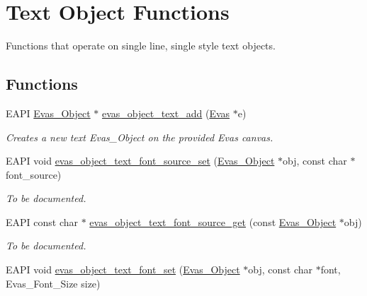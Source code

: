 \section{Text Object Functions}
\label{group__Evas__Object__Text}


Functions that operate on single line, single style text objects.  


\subsection*{Functions}
\begin{DoxyCompactItemize}
\item 
EAPI \hyperlink{group__Evas__Object__Group_ga9e19e6dd1f517a0ba437c0114d3e7c97}{Evas\_\-Object} $\ast$ \hyperlink{group__Evas__Object__Text_ga2da9ad20aec514dfeecb97c715e7f539}{evas\_\-object\_\-text\_\-add} (\hyperlink{group__Evas__Canvas_ga5ff87cc4ce6bc43e3b640a6d37f73043}{Evas} $\ast$e)
\begin{DoxyCompactList}\small\item\em Creates a new text {\ttfamily Evas\_\-Object} on the provided {\ttfamily Evas} canvas. \item\end{DoxyCompactList}\item 
EAPI void \hyperlink{group__Evas__Object__Text_ga6f503ac55e126bebbadf96a152f5d02b}{evas\_\-object\_\-text\_\-font\_\-source\_\-set} (\hyperlink{group__Evas__Object__Group_ga9e19e6dd1f517a0ba437c0114d3e7c97}{Evas\_\-Object} $\ast$obj, const char $\ast$font\_\-source)
\begin{DoxyCompactList}\small\item\em To be documented. \item\end{DoxyCompactList}\item 
EAPI const char $\ast$ \hyperlink{group__Evas__Object__Text_gaa48bece59070032504a2c78ad8a66577}{evas\_\-object\_\-text\_\-font\_\-source\_\-get} (const \hyperlink{group__Evas__Object__Group_ga9e19e6dd1f517a0ba437c0114d3e7c97}{Evas\_\-Object} $\ast$obj)
\begin{DoxyCompactList}\small\item\em To be documented. \item\end{DoxyCompactList}\item 
EAPI void \hyperlink{group__Evas__Object__Text_ga6c7fc38657a876997ad91ebd177669a6}{evas\_\-object\_\-text\_\-font\_\-set} (\hyperlink{group__Evas__Object__Group_ga9e19e6dd1f517a0ba437c0114d3e7c97}{Evas\_\-Object} $\ast$obj, const char $\ast$font, Evas\_\-Font\_\-Size size)

\end{DoxyCompactItemize}
